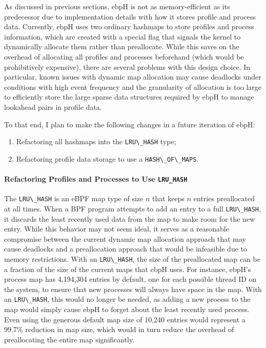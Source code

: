 \documentclass[
  12pt]{findlay}
\newcommand{\passthrough}[1]{#1}
\providecommand{\tightlist}{\setlength{\itemsep}{0pt}\setlength{\parskip}{0pt}}
\begin{document}
As discussed in previous sections, ebpH is not as memory-efficient as
its predecessor due to implementation details with how it stores profile
and process data. Currently, ebpH uses two ordinary hashmaps to store
profiles and process information, which are created with a special flag
that signals the kernel to dynamically allocate them rather than
preallocate. While this saves on the overhead of allocating all profiles
and processes beforehand (which would be prohibitively expensive), there
are several problems with this design choice. In particular, known
issues with dynamic map allocation may cause deadlocks under conditions
with high event frequency \autocite{starovoitov16prealloc} and the
granularity of allocation is too large to efficiently store the large
sparse data structures required by ebpH to manage lookahead pairs in
profile data.

To that end, I plan to make the following changes in a future iteration
of ebpH:

\begin{enumerate}
\def\labelenumi{\arabic{enumi})}
\tightlist
\item
  Refactoring all hashmaps into the \passthrough{\lstinline!LRU\_HASH!}
  type;
\item
  Refactoring profile data storage to use a
  \passthrough{\lstinline!HASH\_OF\_MAPS!}.
\end{enumerate}

\hypertarget{refactoring-profiles-and-processes-to-use-lru_hash}{%
\paragraph{\texorpdfstring{Refactoring Profiles and Processes to Use
\texttt{LRU\_HASH}}{Refactoring Profiles and Processes to Use LRU\_HASH}}\label{refactoring-profiles-and-processes-to-use-lru_hash}}

The \passthrough{\lstinline!LRU\_HASH!} \autocite{bcc,gregg19bpf} is an
eBPF map type of size \(n\) that keeps \(n\) entries preallocated at all
times. When a BPF program attempts to add an entry to a full
\passthrough{\lstinline!LRU\_HASH!}, it discards the least recently used
data from the map to make room for the new entry. While this behavior
may not seem ideal, it serves as a reasonable compromise between the
current dynamic map allocation approach that may cause deadlocks and a
preallocation approach that would be infeasible due to memory
restrictions. With an \passthrough{\lstinline!LRU\_HASH!}, the size of
the preallocated map can be a fraction of the size of the current maps
that ebpH uses. For instance, ebpH's process map has 4,194,304 entries
by default, one for each possible thread ID on the system, to ensure
that new processes will always have space in the map. With an
\passthrough{\lstinline!LRU\_HASH!}, this would no longer be needed, as
adding a new process to the map would simply cause ebpH to forget about
the least recently used process. Even using the generous default map
size of 10,240 entries would represent a 99.7\% reduction in map size,
which would in turn reduce the overhead of preallocating the entire map
significantly.
\end{document}
